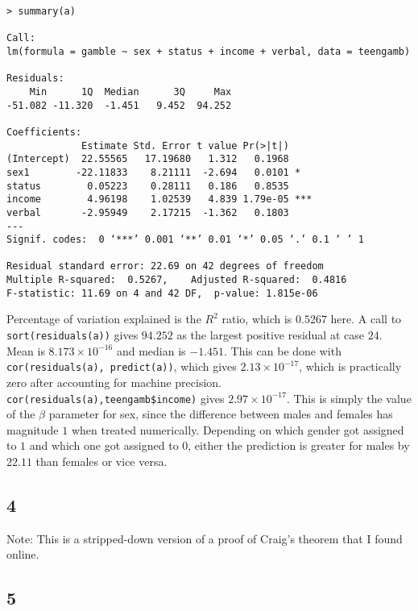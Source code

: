 \documentclass{article}
\begin{document}
\begin{verbatim}
> summary(a)

Call:
lm(formula = gamble ~ sex + status + income + verbal, data = teengamb)

Residuals:
    Min      1Q  Median      3Q     Max 
-51.082 -11.320  -1.451   9.452  94.252 

Coefficients:
             Estimate Std. Error t value Pr(>|t|)    
(Intercept)  22.55565   17.19680   1.312   0.1968    
sex1        -22.11833    8.21111  -2.694   0.0101 *  
status        0.05223    0.28111   0.186   0.8535    
income        4.96198    1.02539   4.839 1.79e-05 ***
verbal       -2.95949    2.17215  -1.362   0.1803    
---
Signif. codes:  0 ‘***’ 0.001 ‘**’ 0.01 ‘*’ 0.05 ‘.’ 0.1 ‘ ’ 1

Residual standard error: 22.69 on 42 degrees of freedom
Multiple R-squared:  0.5267,	Adjusted R-squared:  0.4816 
F-statistic: 11.69 on 4 and 42 DF,  p-value: 1.815e-06
\end{verbatim}
Percentage of variation explained is the $R^2$ ratio, which is $0.5267$ here.
A call to \verb|sort(residuals(a))| gives $94.252$ as the largest positive residual at case $24$.
Mean is $8.173\times10^{-16}$ and median is $-1.451$.
This can be done with \verb|cor(residuals(a), predict(a))|, which gives $2.13\times10^{-17}$, which is practically zero after accounting for machine precision.
\verb|cor(residuals(a),teengamb$income)| gives $2.97\times10^{-17}$.
This is simply the value of the $\beta$ parameter for sex, since the difference between males and females has magnitude $1$ when treated numerically. Depending on which gender got assigned to $1$ and which one got assigned to $0$, either the prediction is greater for males by $22.11$ than females or vice versa.
\subsection*{4}
Note: This is a stripped-down version of a proof of Craig's theorem that I found online. 


\subsection*{5}
\end{document}
